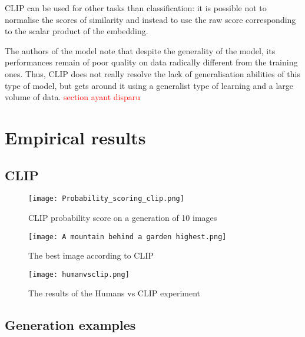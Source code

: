 \documentclass{article}
\begin{document}
\begin{appendix}
CLIP can be used for other tasks than classification: it is possible not to normalise the scores of similarity and instead to use the raw score corresponding to the scalar product of the embedding. 

The authors of the model note that despite the generality of the model, its performances remain of poor quality on data radically different from the training ones. Thus, CLIP does not really resolve the lack of generalisation abilities of this type of model, but gets around it using a generalist type of learning and a large volume of data. 
\textcolor{red}{section ayant disparu}

\section{Empirical results}

\subsection{CLIP}

\begin{figure}[H]
    \centering
    \texttt{[image: Probability\_scoring\_clip.png]}
    \caption{CLIP probability score on a generation of 10 images}
    \label{fig:clip_proba_exemple}
\end{figure}

\begin{figure}[H]
    \centering
    \texttt{[image: A mountain behind a garden highest.png]}
    \caption{The best image according to CLIP}
    \label{fig:clip_image_exemple}
\end{figure}

\begin{figure}[H]
    \centering
    \texttt{[image: humanvsclip.png]}
    \caption{The results of the Humans vs CLIP experiment}
    \label{fig:Humans vs CLIP}
\end{figure}


\subsection{Generation examples}


\end{appendix}
\end{document}
